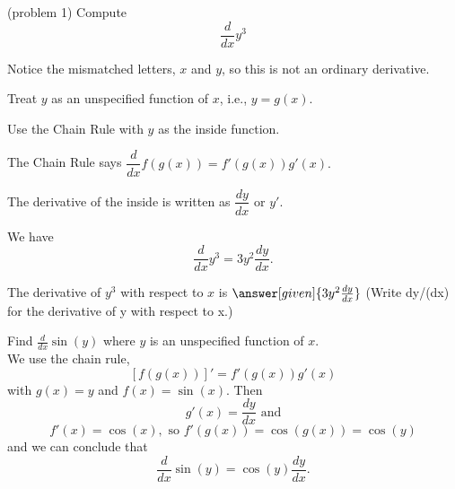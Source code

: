 \documentclass{ximera}
\begin{document}
\begin{problem}(problem 1)
  Compute
  \[
  \frac{d}{dx} y^3
  \]
  
	  \begin{hint}
		  Notice the mismatched letters, $x$ and $y$, so this is not an ordinary derivative.
    \end{hint}
		\begin{hint}
      Treat $y$ as an unspecified function of $x$, i.e., $y = g(x)$.
    \end{hint}
    \begin{hint}
      Use the Chain Rule with $y$ as the inside function.
    \end{hint}
    \begin{hint}
      The Chain Rule says $\dfrac{d}{dx} f(g(x)) = f'(g(x)) g'(x).$
    \end{hint}
		\begin{hint}
		  The derivative of the inside is written as $\dfrac{dy}{dx}$ or $y'$.
    \end{hint}
		\begin{hint}
      We have
      \[
      \frac{d}{dx} y^3 =  3y^2 \dfrac{dy}{dx}.
      \]
    \end{hint}
    
		The derivative of $y^3$ with respect to $x$ is
		 $\answer[given]{3y^2 \dd[y]{x}}$ (Write dy/(dx) for the derivative of y with respect to x.)
		
\end{problem}


  

\begin{example}[example 2]
Find $\frac{d}{dx} \sin(y)$ where $y$ is an unspecified function of $x$.\\
We use the chain rule,
\[\displaystyle{[f(g(x))]' = f'(g(x))g'(x)}\]
with $g(x) = y$ and $f(x) = \sin(x)$. Then 
\[g'(x) = \frac{dy}{dx} \text{ and}\]
\[f'(x) = \cos(x), \text{ so } f'(g(x)) = \cos(g(x)) = \cos(y)\]
and we can conclude that
\[\frac{d}{dx} \sin(y) = \cos(y) \frac{dy}{dx}.\]
\end{example}


\begin{center}
\begin{foldable}
\end{foldable}
\end{center}
\end{document}
